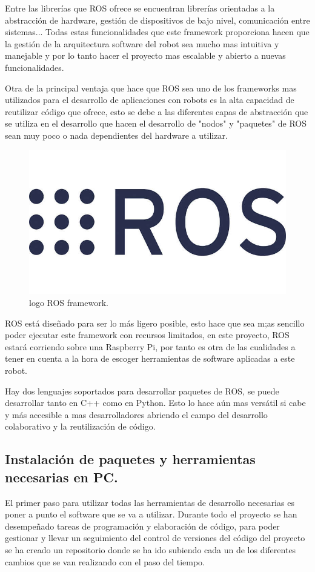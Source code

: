 Entre las librerías que ROS ofrece se encuentran librerías orientadas a la abstracción de hardware, gestión de dispositivos de bajo nivel, comunicación entre sistemas... Todas estas funcionalidades que este framework proporciona hacen que la gestión de la arquitectura software del robot sea mucho mas intuitiva y manejable y por lo tanto hacer el proyecto mas escalable y abierto a nuevas funcionalidades.

Otra de la principal ventaja que hace que ROS sea uno de los frameworks mas utilizados para el desarrollo de aplicaciones con robots es la alta capacidad de reutilizar código que ofrece, esto se debe a las diferentes capas de abstracción que se utiliza en el desarrollo que hacen el desarrollo de "nodos" y "paquetes" de ROS sean muy poco o nada dependientes del hardware a utilizar.

\begin{figure}[h]
    \centering
    \includegraphics[scale=0.2]{fig/ros.jpg}
    \caption{logo ROS framework.}
    \label{fig:mesh1}
\end{figure}

ROS está diseñado para ser lo más ligero posible, esto hace que sea m;as sencillo poder ejecutar este framework con recursos limitados, en este proyecto, ROS estará corriendo sobre una Raspberry Pi, por tanto es otra de las cualidades a tener en cuenta a la hora de escoger herramientas de software aplicadas a este robot.

Hay dos lenguajes soportados para desarrollar paquetes de ROS, se puede desarrollar tanto en C++ como en Python. Esto lo hace aún mas versátil si cabe y más accesible a mas desarrolladores abriendo el campo del desarrollo colaborativo y la reutilización de código.
\subsection{Instalación de paquetes y herramientas necesarias en PC.}
El primer paso para utilizar todas las herramientas de desarrollo necesarias es poner a punto el software que se va a utilizar. Durante todo el proyecto se han desempeñado tareas de programación y elaboración de código, para poder gestionar y llevar un seguimiento del control de versiones del código del proyecto se ha creado un repositorio donde se ha ido subiendo cada un de los diferentes cambios que se van realizando con el paso del tiempo.

